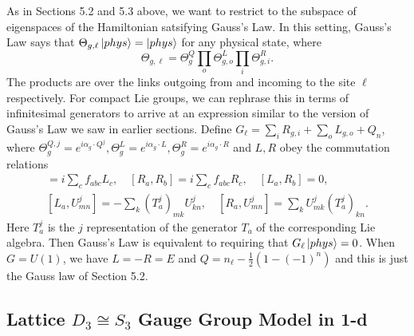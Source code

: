\documentclass[11pt,reqno]{amsart}
\numberwithin{equation}{section}
\begin{document}
	As in Sections 5.2 and 5.3 above, we want to restrict to the subspace of eigenspaces of the Hamiltonian satsifying Gauss's Law.
	In this setting, Gauss's Law says that $\Theta_{g,\ell} \ket{phys} = \ket{phys}$ for any physical state, where
	\begin{equation}
		\Theta_{g,\ell}=\Theta^Q_g\prod_{o} \Theta^L_{g,o} \prod_{i}\Theta^R_{g,i}.
	\end{equation}
	The products are over the links outgoing from and incoming to the site $\ell$ respectively.
	For compact Lie groups, we can rephrase this in terms of infinitesimal generators to arrive at an expression similar to the version of Gauss's Law we saw in earlier sections.
	Define $G_\ell = \sum_{i}R_{g,i}+\sum_{o} L_{g,o} + Q_n$, where
	$\Theta_g^{Q,j}=e^{i\alpha_g \cdot Q^j}, \Theta^L_{g}=e^{i\alpha_g \cdot L}, \Theta^R_g=e^{i\alpha_g \cdot R}$ and $L,R$ obey the commutation relations 
	\begin{align}
		[L_a,L_b]=i\sum_{c}f_{abc}L_c, \quad [R_a,R_b]=i\sum_{c}f_{abc}R_c, \quad [L_a,R_b]=0, \\
		[L_a,U^j_{mn}]=-\sum_{k}(T^j_a)_{mk} U^j_{kn}, \quad [R_a,U^j_{mn}]=\sum_{k}U^j_{mk}(T^j_a)_{kn} . 
	\end{align}
	Here $T^j_a$ is the $j$ representation of the generator $T_a$ of the corresponding Lie algebra.
	Then Gauss's Law is equivalent to requiring that $G_\ell \ket{phys}=0$.
	When $G=U(1)$, we have $L=-R=E$ and $Q=n_\ell - \frac{1}{2}(1-(-1)^n)$ and this is just the Gauss law of Section 5.2.
	
	
	\subsection{Lattice $D_3\cong S_3$ Gauge Group Model in 1-d}	
	
\end{document}
